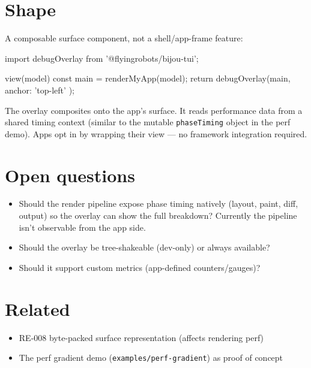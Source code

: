 \section{Shape}\label{record-305-shape}

A composable surface component, not a shell/app-frame feature:

\begin{CodeBlock}
import { debugOverlay } from '@flyingrobots/bijou-tui';

view(model) {
  const main = renderMyApp(model);
  return debugOverlay(main, { anchor: 'top-left' });
}
\end{CodeBlock}

The overlay composites onto the app's surface. It reads performance data from a shared timing context (similar to the mutable \texttt{p\allowbreak{}h\allowbreak{}a\allowbreak{}s\allowbreak{}e\allowbreak{}T\allowbreak{}i\allowbreak{}m\allowbreak{}i\allowbreak{}n\allowbreak{}g} object in the perf demo). Apps opt in by wrapping their view --- no framework integration required.

\section{Open questions}\label{record-305-open-questions}

\begin{itemize}
\tightlist
\item
  Should the render pipeline expose phase timing natively (layout, paint, diff, output) so the overlay can show the full breakdown? Currently the pipeline isn't observable from the app side.
\item
  Should the overlay be tree-shakeable (dev-only) or always available?
\item
  Should it support custom metrics (app-defined counters/gauges)?
\end{itemize}

\section{Related}\label{record-305-related}

\begin{itemize}
\tightlist
\item
  RE-008 byte-packed surface representation (affects rendering perf)
\item
  The perf gradient demo (\texttt{e\allowbreak{}x\allowbreak{}a\allowbreak{}m\allowbreak{}p\allowbreak{}l\allowbreak{}e\allowbreak{}s\allowbreak{}/\allowbreak{}p\allowbreak{}e\allowbreak{}r\allowbreak{}f\allowbreak{}-\allowbreak{}g\allowbreak{}r\allowbreak{}a\allowbreak{}d\allowbreak{}i\allowbreak{}e\allowbreak{}n\allowbreak{}t}) as proof of concept
\end{itemize}

